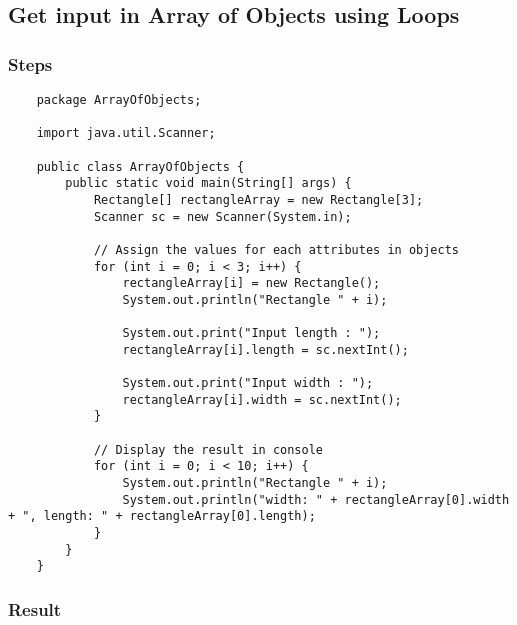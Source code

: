 \documentclass[12pt,titlepage]{article}
\begin{document}
\subsection{Get input in Array of Objects using Loops}

\subsubsection{Steps}

\begin{verbatim}
    package ArrayOfObjects;

    import java.util.Scanner;

    public class ArrayOfObjects {
        public static void main(String[] args) {
            Rectangle[] rectangleArray = new Rectangle[3];
            Scanner sc = new Scanner(System.in);

            // Assign the values for each attributes in objects
            for (int i = 0; i < 3; i++) {
                rectangleArray[i] = new Rectangle();
                System.out.println("Rectangle " + i);

                System.out.print("Input length : ");
                rectangleArray[i].length = sc.nextInt();

                System.out.print("Input width : ");
                rectangleArray[i].width = sc.nextInt();
            }

            // Display the result in console
            for (int i = 0; i < 10; i++) {
                System.out.println("Rectangle " + i);
                System.out.println("width: " + rectangleArray[0].width + ", length: " + rectangleArray[0].length);
            }
        }
    }
\end{verbatim}

\subsubsection{Result}
\end{document}
